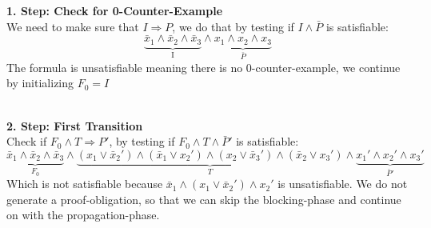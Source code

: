\documentclass[11pt, a4paper, BCOR=10mm, ngerman, oneside]{scrbook}
\begin{document}
\textbf{1. Step: Check for 0-Counter-Example} \\ We need to make sure that $ I \Rightarrow P$, we do that by testing if $I \land \bar P$ is satisfiable:
\begin{equation*}
\underbrace{\bar x_1 \land \bar x_2 \land \bar x_3}_{\text{I}} \land \underbrace{x_1 \land x_2 \land x_3}_{ \bar P}
\end{equation*}
The formula is unsatisfiable meaning there is no 0-counter-example, we continue by initializing $F_0 = I$ \\ \\  \par

\textbf{2. Step: First Transition}\\
Check if $F_0 \land T \Rightarrow P'$, by testing if $F_0 \land T \land \bar P'$ is satisfiable: 
\begin{equation*}
\underbrace{\bar x_1 \land \bar x_2 \land \bar x_3}_{F_0} \land \underbrace{(x_1 \lor \bar x_2' ) \land ( \bar x_1 \lor x_2') \land (x_2 \lor \bar x_3') \land ( \bar x_2 \lor x_3')}_{T} \land \underbrace{ x_1' \land x_2' \land x_3'}_{\bar P'}
\end{equation*}
Which is not satisfiable because $\bar x_1 \land (x_1 \lor \bar x_2') \land x_2'$ is unsatisfiable. We do not generate a proof-obligation, so that we can skip the blocking-phase and continue on with the propagation-phase. \\ \\ \par
\end{document}
